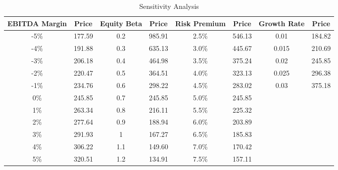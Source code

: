 \begin{table}[ht]
\centering
\begin{tabular}{@{}cccccccc@{}}
\toprule
EBITDA Margin & Price  & Equity Beta & Price  & Risk Premium & Price  & Growth Rate & Price  \\ \midrule
-5\%          & 177.59 & 0.2         & 985.91 & 2.5\%               & 546.13 & 0.01                 & 184.82 \\
-4\%          & 191.88 & 0.3         & 635.13 & 3.0\%               & 445.67 & 0.015                & 210.69 \\
-3\%          & 206.18 & 0.4         & 464.98 & 3.5\%               & 375.24 & 0.02                 & 245.85 \\
-2\%          & 220.47 & 0.5         & 364.51 & 4.0\%               & 323.13 & 0.025                & 296.38 \\
-1\%          & 234.76 & 0.6         & 298.22 & 4.5\%               & 283.02 & 0.03                 & 375.18 \\
0\%           & 245.85 & 0.7         & 245.85 & 5.0\%               & 245.85 &                      &        \\
1\%           & 263.34 & 0.8         & 216.11 & 5.5\%               & 225.32 &                      &        \\
2\%           & 277.64 & 0.9         & 188.94 & 6.0\%               & 203.89 &                      &        \\
3\%           & 291.93 & 1           & 167.27 & 6.5\%               & 185.83 &                      &        \\
4\%           & 306.22 & 1.1         & 149.60 & 7.0\%               & 170.42 &                      &        \\
5\%           & 320.51 & 1.2         & 134.91 & 7.5\%               & 157.11 &                      &        \\ \bottomrule
\end{tabular}
\caption{Sensitivity Analysis}
\label{tab:part1-sensitivity analysis}
\end{table}
